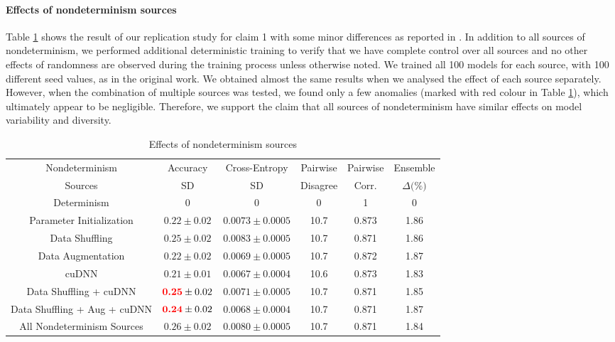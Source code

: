 \paragraph{Effects of nondeterminism sources}
Table \ref{table:table4} shows the result of our replication study for  claim 1 with some minor differences as reported in \cite{summers2021nondeterminism}. In addition to all sources of nondeterminism, we performed additional deterministic training to verify that we have complete control over all sources and no other effects of randomness are observed during the training process unless otherwise noted. We trained all 100 models for each source, with 100 different seed values, as in the original work. We obtained almost the same results when we analysed the effect of each source separately. However, when the combination of multiple sources was tested, we found only a few anomalies (marked with red colour in Table \ref{table:table4}), which ultimately appear to be negligible. Therefore, we support the claim that all sources of nondeterminism have similar effects on model variability and diversity.
\begin{table}[!hb]
\centering
	\begin{tabular}{c|c|c|c|c|c}
	\hline
    Nondeterminism  & Accuracy & Cross-Entropy & Pairwise  & Pairwise & Ensemble \\
    Sources & SD \text{(\%)} & SD \text{(\%)} & Disagree \text{(\%)} & Corr. & $\Delta \text{(\%)}$\\
	\hline
		Determinism  & 0 & 0 & 0 & 1 & 0 \\
		Parameter Initialization & $0.22 \pm 0.02$  & $0.0073 \pm 0.0005$  &  10.7 & 0.873 & 1.86  \\
	    Data Shuffling & $0.25 \pm 0.02$ & $0.0083 \pm 0.0005$  &  10.7 & 0.871 & 1.86   \\
	    Data Augmentation & $0.22 \pm 0.02$ & $0.0069 \pm 0.0005$  &  10.7 & 0.872 & 1.87  \\
	    cuDNN & $0.21 \pm 0.01$ & $0.0067 \pm 0.0004$  &  10.6 & 0.873 & 1.83  \\
	    Data Shuffling + cuDNN & $\textbf{\textcolor{red}{0.25}} \pm 0.02$ & $0.0071 \pm 0.0005$  &  10.7 & 0.871 & 1.85 \\
	    Data Shuffling + Aug + cuDNN & $\textbf{\textcolor{red}{0.24}} \pm 0.02$ & $0.0068 \pm 0.0004$  &  10.7 & 0.871 & 1.87  \\
	    All Nondeterminism Sources & $0.26 \pm 0.02$ & $0.0080 \pm 0.0005$  &  10.7 & 0.871 & 1.84  \\
		\hline
	\end{tabular}
	\caption{Effects of nondeterminism sources}
	\label{table:table4}
\end{table}

